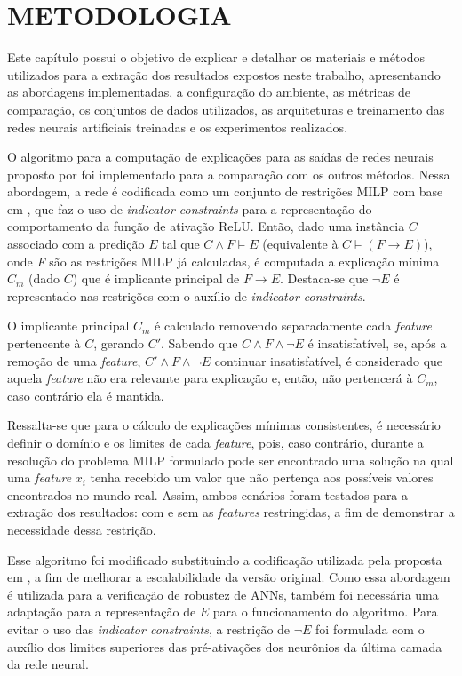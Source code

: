 \chapter{METODOLOGIA}

Este capítulo possui o objetivo de explicar e detalhar os materiais e métodos utilizados para a extração dos resultados expostos neste trabalho, apresentando as abordagens implementadas, a configuração do ambiente, as métricas de comparação, os conjuntos de dados utilizados, as arquiteturas e treinamento das redes neurais artificiais treinadas e os experimentos realizados.

O algoritmo para a computação de explicações para as saídas de redes neurais proposto por  foi implementado para a comparação com os outros métodos. Nessa abordagem, a rede é codificada como um conjunto de restrições MILP com base em , que faz o uso de \textit{indicator constraints} para a representação do comportamento da função de ativação ReLU. Então, dado uma instância $C$ associado com a predição $E$ tal que $C \wedge F \models E$ (equivalente à $C \models (F \rightarrow E)$), onde \textit{F} são as restrições MILP já calculadas, é computada a explicação mínima $C_m$ (dado $C$) que é implicante principal de  $F \rightarrow E$. Destaca-se que $\neg E$ é representado nas restrições com o auxílio de \textit{indicator constraints}.

O implicante principal $C_m$ é calculado removendo separadamente cada \textit{feature} pertencente à $C$, gerando $C'$. Sabendo que $C \wedge F \wedge \neg E$ é insatisfatível, se, após a remoção de uma \textit{feature}, $C' \wedge F \wedge \neg E$ continuar insatisfatível, é considerado que aquela \textit{feature} não era relevante para explicação e, então, não pertencerá à $C_m$, caso contrário ela é mantida.

Ressalta-se que para o cálculo de explicações mínimas consistentes, é necessário definir o domínio e os limites de cada \textit{feature}, pois, caso contrário, durante a resolução do problema MILP formulado pode ser encontrado uma solução na qual uma \textit{feature} $x_i$ tenha recebido um valor que não pertença aos possíveis valores encontrados no mundo real. Assim, ambos cenários foram testados para a extração dos resultados: com e sem as \textit{features} restringidas, a fim de demonstrar a necessidade dessa restrição. 

Esse algoritmo foi modificado substituindo a codificação utilizada pela proposta em , a fim de melhorar a escalabilidade da versão original. Como essa abordagem é utilizada para a verificação de robustez de ANNs, também foi necessária uma adaptação para a representação de $E$ para o funcionamento do algoritmo. Para evitar o uso das \textit{indicator constraints}, a restrição de $\neg E$ foi formulada com o auxílio dos limites superiores das pré-ativações dos neurônios da última camada da rede neural.

